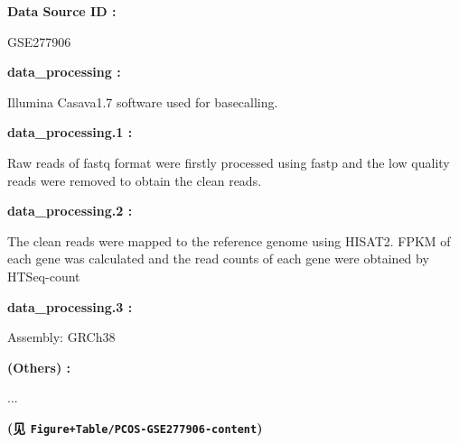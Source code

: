\documentclass[
]{article}
\begin{document}
\begin{center}\begin{tcolorbox}[colback=gray!10, colframe=gray!50, width=0.9\linewidth, arc=1mm, boxrule=0.5pt]
\textbf{
Data Source ID
:}

\vspace{0.5em}

    GSE277906

\vspace{2em}


\textbf{
data\_processing
:}

\vspace{0.5em}

    Illumina Casava1.7 software used for basecalling.

\vspace{2em}


\textbf{
data\_processing.1
:}

\vspace{0.5em}

    Raw reads of fastq format were firstly processed using
fastp and the low quality reads were removed to obtain the
clean reads.

\vspace{2em}


\textbf{
data\_processing.2
:}

\vspace{0.5em}

    The clean reads were mapped to the reference genome
using HISAT2. FPKM of each gene was calculated and the read
counts of each gene were obtained by HTSeq-count

\vspace{2em}


\textbf{
data\_processing.3
:}

\vspace{0.5em}

    Assembly: GRCh38

\vspace{2em}


\textbf{
(Others)
:}

\vspace{0.5em}

    ...

\vspace{2em}
\end{tcolorbox}
\end{center}

\textbf{(见 \texttt{Figure+Table/PCOS-GSE277906-content})}
\end{document}
